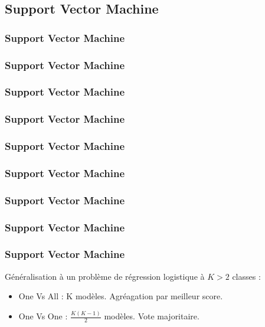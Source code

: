 \subsection{Support Vector Machine}

\begin{frame}
  \frametitle{Support Vector Machine}
\end{frame}

\begin{frame}
  \frametitle{Support Vector Machine}
\end{frame}

\begin{frame}
  \frametitle{Support Vector Machine}
\end{frame}

\begin{frame}
  \frametitle{Support Vector Machine}
\end{frame}

\begin{frame}
  \frametitle{Support Vector Machine}
\end{frame}

\begin{frame}
  \frametitle{Support Vector Machine}
\end{frame}

\begin{frame}
  \frametitle{Support Vector Machine}
\end{frame}

\begin{frame}
  \frametitle{Support Vector Machine}
\end{frame}

\begin{frame}
  \frametitle{Support Vector Machine}
  Généralisation à un problème de régression logistique à $K>2$ classes :
  \begin{itemize}
  \item One Vs All : K modèles. Agréagation par meilleur score.
  \item One Vs One : $\frac{K(K-1)}{2}$ modèles. Vote majoritaire.
  \end{itemize}
\end{frame}

